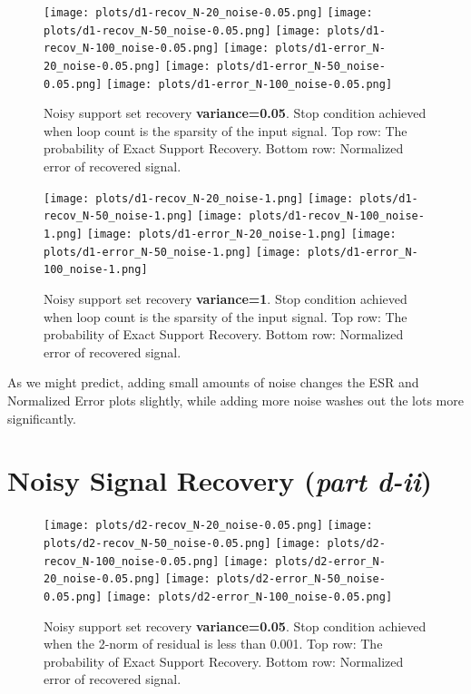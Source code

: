 \documentclass{article}
\begin{document}
\begin{figure}[h]
    \captionsetup{width=.75\linewidth}
    \centering
        \texttt{[image: plots/d1-recov\_N-20\_noise-0.05.png]}
        \texttt{[image: plots/d1-recov\_N-50\_noise-0.05.png]}
        \texttt{[image: plots/d1-recov\_N-100\_noise-0.05.png]}
        \newline
        \texttt{[image: plots/d1-error\_N-20\_noise-0.05.png]}
        \texttt{[image: plots/d1-error\_N-50\_noise-0.05.png]}
        \texttt{[image: plots/d1-error\_N-100\_noise-0.05.png]}
        \caption{Noisy support set recovery {\bf variance=0.05}. Stop condition achieved when loop count is the sparsity of the input signal. Top row: The probability of Exact Support Recovery. Bottom row: Normalized error of recovered signal.}
\end{figure}


\begin{figure}[h]
    \captionsetup{width=.75\linewidth}
    \centering
        \texttt{[image: plots/d1-recov\_N-20\_noise-1.png]}
        \texttt{[image: plots/d1-recov\_N-50\_noise-1.png]}
        \texttt{[image: plots/d1-recov\_N-100\_noise-1.png]}
        \newline
        \texttt{[image: plots/d1-error\_N-20\_noise-1.png]}
        \texttt{[image: plots/d1-error\_N-50\_noise-1.png]}
        \texttt{[image: plots/d1-error\_N-100\_noise-1.png]}
        \caption{Noisy support set recovery {\bf variance=1}. Stop condition achieved when loop count is the sparsity of the input signal. Top row: The probability of Exact Support Recovery. Bottom row: Normalized error of recovered signal.}
\end{figure}


As we might predict, adding small amounts of noise changes the ESR and Normalized Error plots slightly, while adding more noise washes out the lots more significantly.




\newpage
\section*{Noisy Signal Recovery ({\it part d-ii})}


\begin{figure}[h]
    \captionsetup{width=.75\linewidth}
    \centering
        \texttt{[image: plots/d2-recov\_N-20\_noise-0.05.png]}
        \texttt{[image: plots/d2-recov\_N-50\_noise-0.05.png]}
        \texttt{[image: plots/d2-recov\_N-100\_noise-0.05.png]}
        \newline
        \texttt{[image: plots/d2-error\_N-20\_noise-0.05.png]}
        \texttt{[image: plots/d2-error\_N-50\_noise-0.05.png]}
        \texttt{[image: plots/d2-error\_N-100\_noise-0.05.png]}
        \caption{Noisy support set recovery {\bf variance=0.05}. Stop condition achieved when the 2-norm of residual is less than 0.001. Top row: The probability of Exact Support Recovery. Bottom row: Normalized error of recovered signal.}
\end{figure}
\end{document}
